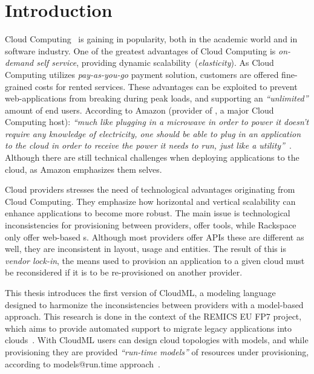 \chapter{Introduction}

Cloud Computing~\cite{Armbrust:EECS-2009-28} is gaining in popularity,
both in the academic world and in software industry.
One of the greatest advantages of Cloud Computing is \emph{on-demand self service},
providing dynamic scalability~(\emph{elasticity}).
As Cloud Computing utilizes \emph{pay-as-you-go} payment solution,
customers are offered fine-grained costs for rented services.
These advantages can be exploited to prevent web-applications
from breaking during peak loads, and supporting an \emph{``unlimited''}
amount of end users.
According to Amazon (provider of , a major Cloud Computing host):
\emph{``much like plugging in a microwave in order to power it doesn't require any knowledge of electricity,
one should be able to plug in an application to the cloud in order
to receive the power it needs to run, 
just like a utility''}~\cite{aws:varia10}.
Although there are still technical challenges when deploying applications to the cloud,
as Amazon emphasizes them selves.

Cloud providers stresses the need of technological advantages originating from Cloud Computing.
They emphasize how horizontal and vertical scalability can enhance applications
to become more robust.
The main issue is technological inconsistencies for provisioning between providers,
\eg {} offer  tools, while Rackspace only offer web-based s.
Although most providers offer APIs these are different as well, 
they are inconsistent in layout, usage and entities.
The result of this is \emph{vendor lock-in}, the means used to provision an application to
a given cloud must be reconsidered if it is to be re-provisioned on another provider.

This thesis introduces the first version of CloudML,
a modeling language designed to harmonize the inconsistencies between providers
with a model-based approach.
This research is done in the context of the REMICS EU FP7 project,
which aims to provide automated support to migrate legacy applications into
clouds~\cite{DBLP:conf/services/MohagheghiS11}.
With CloudML users can design cloud topologies with models,
and while provisioning they are provided \emph{``run-time models''} of 
resources under provisioning,
according to models@run.time approach~\cite{DBLP:journals/dagstuhl-reports/AssmannBCF11}.




